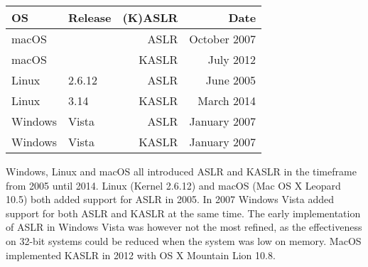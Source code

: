 \begin{table}[!ht]
    \small
    \centering
    \begin{tabular}{llrr}
    \hline
        \textbf{OS} & \textbf{Release} & \textbf{(K)ASLR} & \textbf{Date} \\ \hline
        macOS & ~ & ASLR & October 2007 \\ 
        macOS & ~ & KASLR & July 2012 \\ 
        Linux & 2.6.12 & ASLR & June 2005 \\ 
        Linux & 3.14 & KASLR & March 2014 \\ 
        Windows & Vista & ASLR & January 2007 \\ 
        Windows & Vista & KASLR & January 2007 \\ \hline
    \end{tabular}
\end{table}

Windows, Linux and macOS all introduced ASLR and KASLR in the timeframe from 2005 until 2014.
Linux (Kernel 2.6.12) and macOS (Mac OS X Leopard 10.5) both added support for ASLR in 2005.
In 2007 Windows Vista added support for both ASLR and KASLR at the same time. The early implementation of ASLR in Windows Vista was however not the most refined, as the effectiveness on 32-bit systems could be reduced when the system was low on memory.
MacOS implemented KASLR in 2012 with OS X Mountain Lion 10.8.
